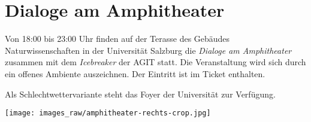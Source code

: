 \newpage
\thispagestyle{empty}
\section*{Dialoge am Amphitheater}
\label{social-event}
Von 18:00 bis 23:00 Uhr finden auf der Terasse des Gebäudes Naturwissenschaften in der Universität Salzburg
die \emph{Dialoge am Amphitheater} zusammen mit dem \emph{Icebreaker} der AGIT statt.
Die Veranstaltung wird sich durch ein offenes Ambiente auszeichnen. Der Eintritt ist im Ticket enthalten.

Als Schlechtwettervariante steht das Foyer der Universität zur Verfügung.

\noindent
\begin{center}
  \texttt{[image: images\_raw/amphitheater-rechts-crop.jpg]}
\end{center}

\justifying